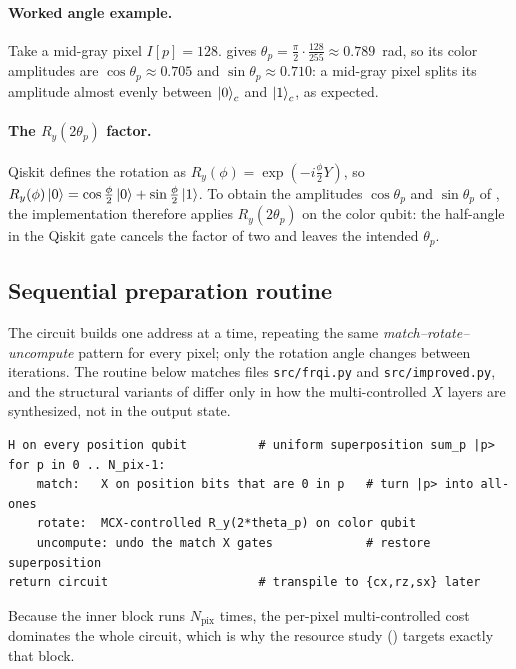 \paragraph{Worked angle example.}
Take a mid-gray pixel $I[p]=128$.  gives $\theta_p=\tfrac{\pi}{2}\cdot\tfrac{128}{255}\approx 0.789$~rad, so its color amplitudes are $\cos\theta_p\approx 0.705$ and $\sin\theta_p\approx 0.710$: a mid-gray pixel splits its amplitude almost evenly between $\ket{0}_c$ and $\ket{1}_c$, as expected.

\paragraph{The $R_y(2\theta_p)$ factor.}
Qiskit defines the rotation as $R_y(\phi)=\exp(-i\tfrac{\phi}{2}Y)$, so $R_y(\phi)\ket{0}=\cos\tfrac{\phi}{2}\ket{0}+\sin\tfrac{\phi}{2}\ket{1}$. To obtain the amplitudes $\cos\theta_p$ and $\sin\theta_p$ of , the implementation therefore applies $R_y(2\theta_p)$ on the color qubit: the half-angle in the Qiskit gate cancels the factor of two and leaves the intended $\theta_p$.

\subsection{Sequential preparation routine}
\label{sec:frqi-seq}
The circuit builds  one address at a time, repeating the same \emph{match--rotate--uncompute} pattern for every pixel; only the rotation angle changes between iterations. The routine below matches files \texttt{src/frqi.py} and \texttt{src/improved.py}, and the structural variants of  differ only in how the multi-controlled $X$ layers are synthesized, not in the output state.
\begin{lstlisting}[language={}, basicstyle=\ttfamily\footnotesize, frame=single, breaklines=true]
H on every position qubit          # uniform superposition sum_p |p>
for p in 0 .. N_pix-1:
    match:   X on position bits that are 0 in p   # turn |p> into all-ones
    rotate:  MCX-controlled R_y(2*theta_p) on color qubit
    uncompute: undo the match X gates             # restore superposition
return circuit                     # transpile to {cx,rz,sx} later
\end{lstlisting}
Because the inner block runs $N_{\mathrm{pix}}$ times, the per-pixel multi-controlled cost dominates the whole circuit, which is why the resource study () targets exactly that block.

